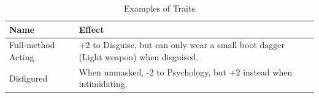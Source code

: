 \begin{table}[h!tbp]
	\begin{center}
		\begin{tabular}{p{4cm}p{12cm}} \toprule
			
		    \textbf{Name} & \textbf{Effect} \\ \midrule

		    Full-method Acting & +2 to Disguise, but can only wear a small boot dagger (Light weapon) when disguised. \\[2mm] 

            Disfigured & When unmasked, -2 to Psychology, but +2 instead when intimidating. \\[2mm] 

		    \bottomrule
		\end{tabular}
	\end{center}
	\caption{Examples of Traits}
  \label{traits_example_table}
\end{table}
